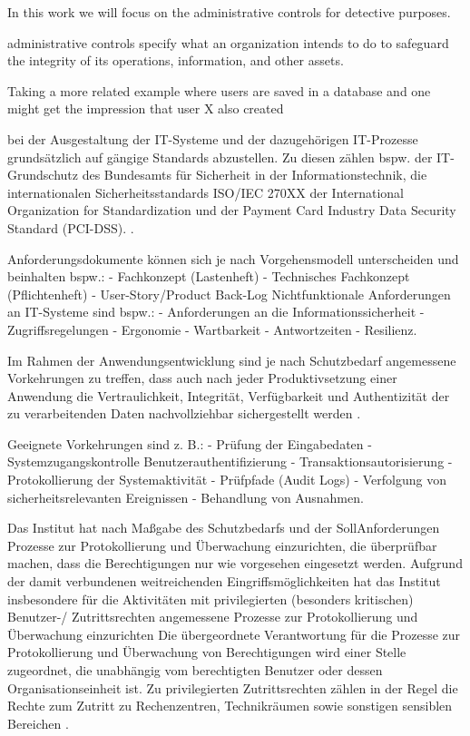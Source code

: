 
In this work we will focus on the administrative controls for detective purposes.

administrative controls specify what an organization intends to do to safeguard the integrity of its operations, information, and other assets.


Taking a more related example where users are saved in a database and one might get the impression that user X also created 

bei der Ausgestaltung der IT-Systeme und der dazugehörigen IT-Prozesse grundsätzlich auf gängige Standards abzustellen. Zu diesen zählen bspw. der IT-Grundschutz des Bundesamts für Sicherheit in der Informationstechnik, die
internationalen Sicherheitsstandards ISO/IEC 270XX der International Organization for Standardization und der Payment Card Industry Data Security
Standard (PCI-DSS). \citep{BaFinZAIT}.

Anforderungsdokumente können sich je nach Vorgehensmodell unterscheiden und beinhalten bspw.:
- Fachkonzept (Lastenheft)
- Technisches Fachkonzept (Pflichtenheft)
- User-Story/Product Back-Log
Nichtfunktionale Anforderungen an IT-Systeme sind bspw.:
- Anforderungen an die Informationssicherheit
- Zugriffsregelungen
- Ergonomie
- Wartbarkeit
- Antwortzeiten
- Resilienz.

Im Rahmen der Anwendungsentwicklung sind je nach Schutzbedarf
angemessene Vorkehrungen zu treffen, dass auch nach jeder
Produktivsetzung einer Anwendung die Vertraulichkeit, Integrität, Verfügbarkeit und Authentizität der zu verarbeitenden Daten nachvollziehbar sichergestellt werden \citep{BaFinZAIT}.

Geeignete Vorkehrungen sind z. B.:
- Prüfung der Eingabedaten
- Systemzugangskontrolle Benutzerauthentifizierung
- Transaktionsautorisierung
- Protokollierung der Systemaktivität
- Prüfpfade (Audit Logs)
- Verfolgung von sicherheitsrelevanten Ereignissen
- Behandlung von Ausnahmen.


Das Institut hat nach Maßgabe des Schutzbedarfs und der SollAnforderungen Prozesse zur Protokollierung und Überwachung einzurichten, die überprüfbar machen, dass die Berechtigungen nur wie
vorgesehen eingesetzt werden. Aufgrund der damit verbundenen
weitreichenden Eingriffsmöglichkeiten hat das Institut insbesondere
für die Aktivitäten mit privilegierten (besonders kritischen)
Benutzer-/ Zutrittsrechten angemessene Prozesse zur Protokollierung
und Überwachung einzurichten
Die übergeordnete Verantwortung für die Prozesse zur Protokollierung und
Überwachung von Berechtigungen wird einer Stelle zugeordnet, die unabhängig vom berechtigten Benutzer oder dessen Organisationseinheit ist. Zu
privilegierten Zutrittsrechten zählen in der Regel die Rechte zum Zutritt zu
Rechenzentren, Technikräumen sowie sonstigen sensiblen Bereichen \citep{BaFinZAIT}.

